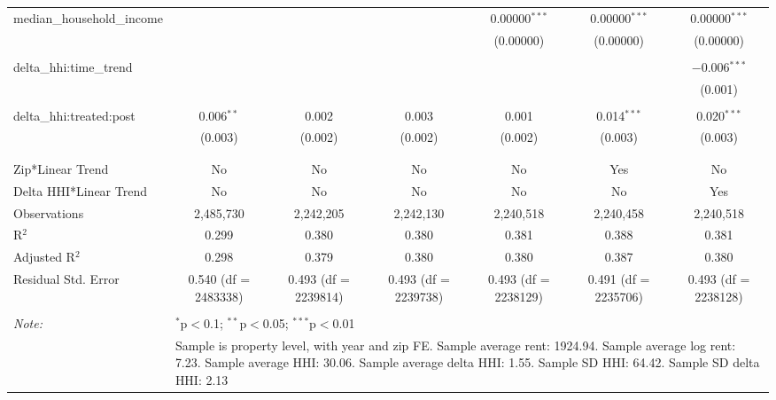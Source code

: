 \begin{table}[H]
{\begin{tabular}{@{\extracolsep{5pt}}lcccccc}
  median\_household\_income &  &  &  & 0.00000$^{***}$ & 0.00000$^{***}$ & 0.00000$^{***}$ \\  

   &  &  &  & (0.00000) & (0.00000) & (0.00000) \\  

   & & & & & & \\  

  delta\_hhi:time\_trend &  &  &  &  &  & $-$0.006$^{***}$ \\  

   &  &  &  &  &  & (0.001) \\  

   & & & & & & \\  

  delta\_hhi:treated:post & 0.006$^{**}$ & 0.002 & 0.003 & 0.001 & 0.014$^{***}$ & 0.020$^{***}$ \\  

   & (0.003) & (0.002) & (0.002) & (0.002) & (0.003) & (0.003) \\  

   & & & & & & \\  

 \hline \\[-1.8ex]  

 Zip*Linear Trend & No & No & No & No & Yes & No \\  

 Delta HHI*Linear Trend & No & No & No & No & No & Yes \\  

 Observations & 2,485,730 & 2,242,205 & 2,242,130 & 2,240,518 & 2,240,458 & 2,240,518 \\  

 R$^{2}$ & 0.299 & 0.380 & 0.380 & 0.381 & 0.388 & 0.381 \\  

 Adjusted R$^{2}$ & 0.298 & 0.379 & 0.380 & 0.380 & 0.387 & 0.380 \\  

 Residual Std. Error & 0.540 (df = 2483338) & 0.493 (df = 2239814) & 0.493 (df = 2239738) & 0.493 (df = 2238129) & 0.491 (df = 2235706) & 0.493 (df = 2238128) \\  

 \hline  

 \hline \\[-1.8ex]  

 \textit{Note:}  & \multicolumn{6}{l}{$^{*}$p$<$0.1; $^{**}$p$<$0.05; $^{***}$p$<$0.01} \\  

  & \multicolumn{6}{l}{Sample is property level, with year and zip FE. Sample average rent: 1924.94. Sample average log rent: 7.23. Sample average HHI: 30.06. Sample average delta HHI: 1.55. Sample SD HHI: 64.42. Sample SD delta HHI: 2.13} \\  

 \end{tabular}}  

 \end{table}  

